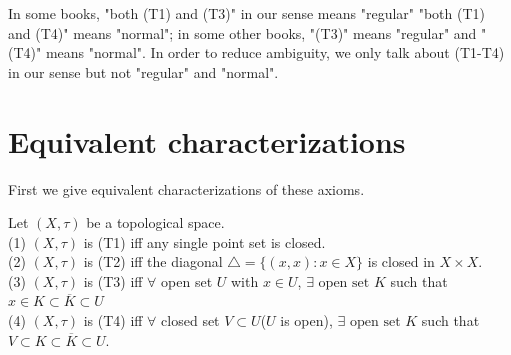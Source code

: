 \begin{remark}
    In some books, "both (T1) and (T3)" in our sense means "regular" 
    "both (T1) and (T4)" means "normal"; in some other books, "(T3)" means "regular"
    and "(T4)" means "normal". In order to reduce ambiguity, we only talk about (T1-T4) in our sense
    but not "regular" and "normal". 

\end{remark}

\section{Equivalent characterizations}
First we give equivalent characterizations of these axioms.
\begin{proposition}{}{}
    Let $(X,\tau)$ be a topological space.\\
    (1) $(X,\tau)$ is (T1) iff any single point set is closed.\\
    (2) $(X,\tau)$ is (T2) iff the diagonal $\triangle =\{(x,x):x\in X\}$ is closed in $X\times X$.\\
    (3) $(X,\tau)$ is (T3) iff $\forall$ open set $U$ with $x\in U$, $\exists \text{ open set } K$ such that $x\in K\subset \overline{K}\subset U$\\
    (4) $(X,\tau)$ is (T4) iff $\forall$ closed set $V\subset U$($U$ is open), $\exists \text{ open set }K$ such that $V\subset K\subset \overline{K}\subset U$.
\end{proposition}

